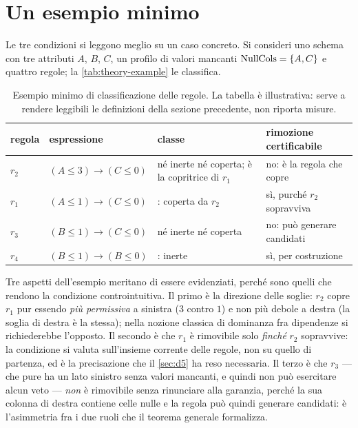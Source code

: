 \section{Un esempio minimo}\label{sec:theory-example}

Le tre condizioni si leggono meglio su un caso concreto. Si consideri uno schema con tre
attributi $A$, $B$, $C$, un profilo di valori mancanti $\mathrm{NullCols} = \{A, C\}$ e quattro regole; la
\autoref{tab:theory-example} le classifica.

\begin{table}[htbp]
\centering
\caption{Esempio minimo di classificazione delle regole. La tabella è illustrativa: serve a
rendere leggibili le definizioni della sezione precedente, non riporta misure.}
\label{tab:theory-example}
\footnotesize
\begin{tabular}{@{}llll@{}}
\toprule
regola & espressione & classe & rimozione certificabile \\
\midrule
$r_2$ & $(A \le 3) \to (C \le 0)$ & né inerte né coperta; è la copritrice di $r_1$ & no: è la regola che copre \\
$r_1$ & $(A \le 1) \to (C \le 0)$ & \Vtwo{}: coperta da $r_2$ & sì, purché $r_2$ sopravviva \\
$r_3$ & $(B \le 1) \to (C \le 0)$ & né inerte né coperta & no: può generare candidati \\
$r_4$ & $(B \le 1) \to (B \le 0)$ & \Vthree{}: inerte & sì, per costruzione \\
\bottomrule
\end{tabular}
\end{table}

Tre aspetti dell'esempio meritano di essere evidenziati, perché sono quelli che rendono la
condizione \Vtwo{} controintuitiva. Il primo è la direzione delle soglie: $r_2$ copre $r_1$ pur
essendo \emph{più permissiva} a sinistra ($3$ contro $1$) e non più debole a destra (la soglia di
destra è la stessa); nella nozione classica di dominanza fra dipendenze si richiederebbe l'opposto.
Il secondo è che $r_1$ è rimovibile solo \emph{finché} $r_2$ sopravvive: la condizione si valuta
sull'insieme corrente delle regole, non su quello di partenza, ed è la precisazione che il
\autoref{sec:d5} ha reso necessaria. Il terzo è che $r_3$ --- che pure ha un lato sinistro senza
valori mancanti, e quindi non può esercitare alcun veto --- \emph{non} è rimovibile senza
rinunciare alla garanzia, perché la sua colonna di destra contiene celle nulle e la regola può
quindi generare candidati: è l'asimmetria fra i due ruoli che il teorema generale formalizza.

